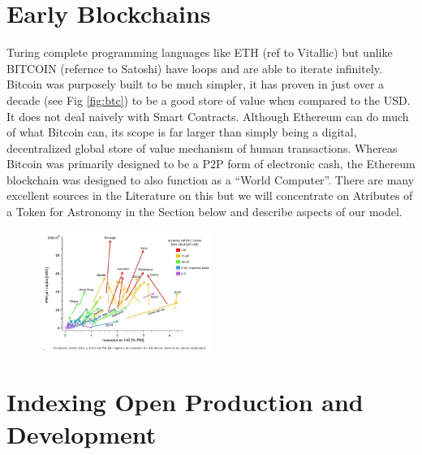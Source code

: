 \documentclass[final,5p,times,twocolumn,authoryear]{elsarticle}
\begin{document}
\section{Early Blockchains}
Turing complete programming languages like ETH (ref to Vitallic) but unlike BITCOIN  (refernce to Satoshi) have loops and are able to iterate infinitely.  Bitcoin was purposely built to be much simpler, it has proven in just over a decade (see Fig \ref{fig:btc}) to be a good store of value when compared to the USD. It does not deal naively with Smart Contracts. Although Ethereum can do much of what Bitcoin can, its scope is far larger than simply being a digital, decentralized global store of value mechanism of human transactions. Whereas Bitcoin was primarily designed to be a P2P form of electronic cash, the Ethereum blockchain was designed to also function as a “World Computer”. There are many excellent sources in the Literature on this but we will concentrate on Atributes of a Token for Astronomy in the Section below and describe aspects of our model.
 
\begin{figure}
    \centering
    \includegraphics[width=0.5\textwidth]{figs/Docuemnto_Stefani_2.jpg}
    \caption{\href{https://aargentinapciencias.org/wp-content/uploads/2019/05/Docuemnto_Stefani.pdf}{}} 
\end{figure}
\section{Indexing Open Production and Development}
\end{document}
